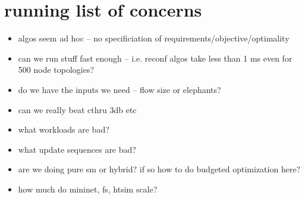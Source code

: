 \section{running list of concerns}

\begin{itemize}

\item algos seem ad hoc -- no specificiation of
requirements/objective/optimality  

\item can we run stuff fast enough -- i.e. reconf algos take less than 1 ms 
 even for 500 node topologies? 

\item do we have the inputs we need -- flow size or elephants?

\item can we really beat cthru 3db etc

\item what workloads are bad?

\item what update sequences are bad?

\item are we doing pure sm or hybrid? if so how to do budgeted optimization here?

\item how much do mininet, fs, htsim scale?

\end{itemize}
